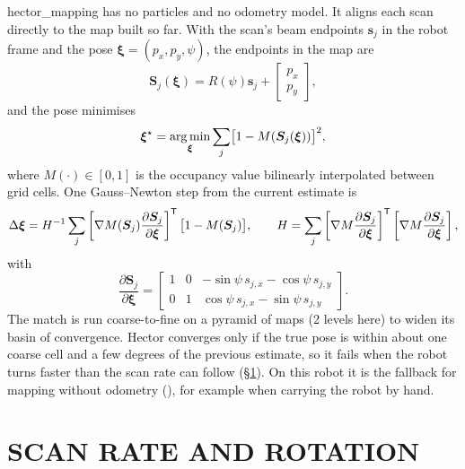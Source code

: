 hector\_mapping \cite{kohlbrecher2011flexible} has no particles and no
odometry model. It aligns each scan directly to the map built so far. With the
scan's beam endpoints $\bm s_j$ in the robot frame and the pose
$\bm\xi=(p_x,p_y,\psi)$, the endpoints in the map are
\begin{equation}
\bm S_j(\bm\xi) = R(\psi)\bm s_j + \begin{bmatrix}p_x\\p_y\end{bmatrix},
\end{equation}
and the pose minimises
\begin{equation}\label{eq:hectorobj}
\bm\xi^\star=\operatorname*{arg\,min}_{\bm\xi}\sum_j\bigl[1-M(\bm S_j(\bm\xi))\bigr]^2,
\end{equation}
where $M(\cdot)\in[0,1]$ is the occupancy value bilinearly interpolated
between grid cells. One Gauss--Newton step from the current estimate is
\begin{equation}\label{eq:hectorgn}
\Delta\bm\xi = H^{-1}\sum_j\left[\nabla M(\bm S_j)\frac{\partial\bm S_j}{\partial\bm\xi}\right]^{\mathsf T}
\bigl[1-M(\bm S_j)\bigr],\qquad
H=\sum_j\left[\nabla M\frac{\partial\bm S_j}{\partial\bm\xi}\right]^{\mathsf T}
\left[\nabla M\frac{\partial\bm S_j}{\partial\bm\xi}\right],
\end{equation}
with
\begin{equation}
\frac{\partial\bm S_j}{\partial\bm\xi}=
\begin{bmatrix}1&0&-\sin\psi\,s_{j,x}-\cos\psi\,s_{j,y}\\
0&1&\cos\psi\,s_{j,x}-\sin\psi\,s_{j,y}\end{bmatrix}.
\end{equation}
The match is run coarse-to-fine on a pyramid of maps (2 levels here) to widen
its basin of convergence. Hector converges only if the true pose is within
about one coarse cell and a few degrees of the previous estimate, so it fails
when the robot turns faster than the scan rate can follow
(\S\ref{sec:skew}). On this robot it is the fallback for mapping without
odometry (), for example when carrying the
robot by hand.

\section{SCAN RATE AND ROTATION}
\label{sec:skew}

